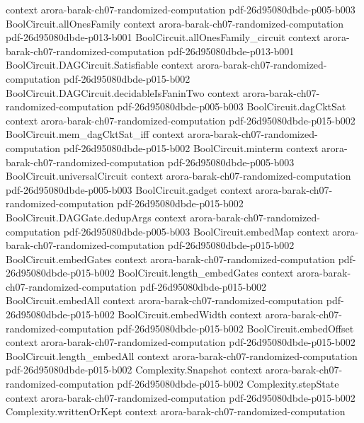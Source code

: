\begin{theorem}
  {context}
  {arora-barak-ch07-randomized-computation}
  {pdf-26d95080dbde-p005-b003}
\proofstep
  {BoolCircuit.allOnesFamily}
  {context}
  {arora-barak-ch07-randomized-computation}
  {pdf-26d95080dbde-p013-b001}
\proofstep
  {BoolCircuit.allOnesFamily_circuit}
  {context}
  {arora-barak-ch07-randomized-computation}
  {pdf-26d95080dbde-p013-b001}
\proofstep
  {BoolCircuit.DAGCircuit.Satisfiable}
  {context}
  {arora-barak-ch07-randomized-computation}
  {pdf-26d95080dbde-p015-b002}
\proofstep
  {BoolCircuit.DAGCircuit.decidableIsFaninTwo}
  {context}
  {arora-barak-ch07-randomized-computation}
  {pdf-26d95080dbde-p005-b003}
\proofstep
  {BoolCircuit.dagCktSat}
  {context}
  {arora-barak-ch07-randomized-computation}
  {pdf-26d95080dbde-p015-b002}
\proofstep
  {BoolCircuit.mem_dagCktSat_iff}
  {context}
  {arora-barak-ch07-randomized-computation}
  {pdf-26d95080dbde-p015-b002}
\proofstep
  {BoolCircuit.minterm}
  {context}
  {arora-barak-ch07-randomized-computation}
  {pdf-26d95080dbde-p005-b003}
\proofstep
  {BoolCircuit.universalCircuit}
  {context}
  {arora-barak-ch07-randomized-computation}
  {pdf-26d95080dbde-p005-b003}
\proofstep
  {BoolCircuit.gadget}
  {context}
  {arora-barak-ch07-randomized-computation}
  {pdf-26d95080dbde-p015-b002}
\proofstep
  {BoolCircuit.DAGGate.dedupArgs}
  {context}
  {arora-barak-ch07-randomized-computation}
  {pdf-26d95080dbde-p005-b003}
\proofstep
  {BoolCircuit.embedMap}
  {context}
  {arora-barak-ch07-randomized-computation}
  {pdf-26d95080dbde-p015-b002}
\proofstep
  {BoolCircuit.embedGates}
  {context}
  {arora-barak-ch07-randomized-computation}
  {pdf-26d95080dbde-p015-b002}
\proofstep
  {BoolCircuit.length_embedGates}
  {context}
  {arora-barak-ch07-randomized-computation}
  {pdf-26d95080dbde-p015-b002}
\proofstep
  {BoolCircuit.embedAll}
  {context}
  {arora-barak-ch07-randomized-computation}
  {pdf-26d95080dbde-p015-b002}
\proofstep
  {BoolCircuit.embedWidth}
  {context}
  {arora-barak-ch07-randomized-computation}
  {pdf-26d95080dbde-p015-b002}
\proofstep
  {BoolCircuit.embedOffset}
  {context}
  {arora-barak-ch07-randomized-computation}
  {pdf-26d95080dbde-p015-b002}
\proofstep
  {BoolCircuit.length_embedAll}
  {context}
  {arora-barak-ch07-randomized-computation}
  {pdf-26d95080dbde-p015-b002}
\proofstep
  {Complexity.Snapshot}
  {context}
  {arora-barak-ch07-randomized-computation}
  {pdf-26d95080dbde-p015-b002}
\proofstep
  {Complexity.stepState}
  {context}
  {arora-barak-ch07-randomized-computation}
  {pdf-26d95080dbde-p015-b002}
\proofstep
  {Complexity.writtenOrKept}
  {context}
  {arora-barak-ch07-randomized-computation}

\end{theorem}

